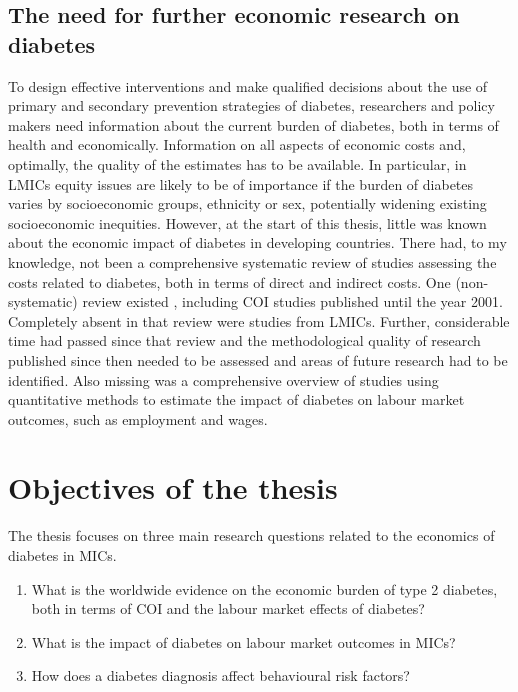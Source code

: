 \subsection{The need for further economic research on diabetes}

To design effective interventions and make qualified decisions about the use of primary and secondary prevention strategies of diabetes, researchers and policy makers need information about the current burden of diabetes, both in terms of health and economically. Information on all aspects of economic costs and, optimally, the quality of the estimates has to be available. In particular, in \acp{LMIC} equity issues are likely to be of importance if the burden of diabetes varies by socioeconomic groups, ethnicity or sex, potentially widening existing socioeconomic inequities. However, at the start of this thesis, little was known about the economic impact of diabetes in developing countries. There had, to my knowledge, not been a comprehensive systematic review of studies assessing the costs related to diabetes, both in terms of direct and indirect costs. One (non-systematic) review existed \parencite{Ettaro2004}, including \ac{COI} studies published until the year 2001. Completely absent in that review were studies from \acp{LMIC}. Further, considerable time had passed since that review and the methodological quality of research published since then needed to be assessed and areas of future research had to be identified. Also missing was a comprehensive overview of studies using quantitative methods to estimate the impact of diabetes on labour market outcomes, such as employment and wages.



\section{Objectives of the thesis}

The thesis focuses on three main research questions related to the economics of diabetes in \acp{MIC}. 

\begin{enumerate}
\item What is the worldwide evidence on the economic burden of type 2 diabetes, both in terms of \ac{COI} and the labour market effects of diabetes? 

\item What is the impact of diabetes on labour market outcomes in \acp{MIC}?

\item How does a diabetes diagnosis affect behavioural risk factors?

\end{enumerate}

